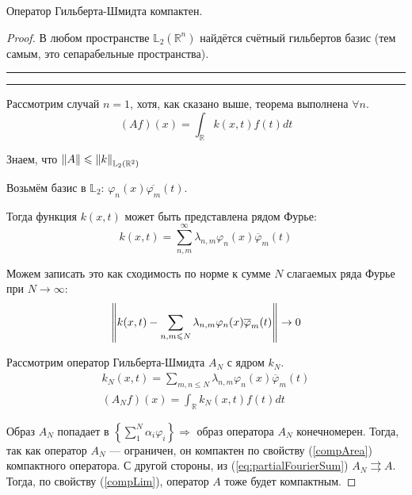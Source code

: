 \documentclass[12pt]{article}
\begin{document}
		\begin{state}
			Оператор Гильберта-Шмидта компактен.
		\end{state}
		\begin{proof}
			В любом пространстве $\mathbb{L}_2(\mathbb{R}^n)$ найдётся счётный гильбертов базис 
			(тем самым, это сепарабельные пространства).
		
			\vspace{2pt}\hrule\vspace{2pt}
		
		
		
			\vspace{2pt}\hrule\vspace{2pt}
		
			Рассмотрим случай $n=1$, хотя, как сказано выше, теорема выполнена $\forall n$. 
			$$(Af)(x) = \int_{\mathbb{R}} k(x,t) f(t) dt$$
		
			Знаем, что $\left\| A \right\| \leqslant \left\| k \right\|_{\mathbb{L}_2(\mathbb{R}^2)}$
		
			Возьмём базис в $\mathbb{L}_2$: $\varphi_n(x)\overline{\varphi_m}(t)$.
		
			Тогда функция $k(x,t)$ может быть представлена рядом Фурье:
			$$k(x,t) = \sum_{n,m}^{\infty}\lambda_{n,m}\varphi_n(x)\overline{\varphi}_m(t)$$
		
			Можем записать это как сходимость по норме к сумме $N$ слагаемых ряда Фурье при $N \rightarrow \infty$:
			\begin{equation} \label{eq:partialFourierSum}
				\left\| k(x,t) - \sum_{n,m\leqslant N}\lambda_{n,m}\varphi_n(x)\overline{\varphi}_m(t) \right\| \rightarrow 0
			\end{equation}
		
			Рассмотрим оператор Гильберта-Шмидта $A_N$ с ядром $k_N$.
			\begin{gather}
				k_N(x,t) = \sum_{m,n \leq N} \lambda_{n,m} \varphi_n(x)\overline{\varphi}_m(t) \\
				(A_Nf)(x) = \int_{\mathbb{R}} k_N(x,t) f(t) dt
			\end{gather}
		
			Образ $A_N$ попадает в $\left\{\sum_1^N \alpha_i \varphi_i \right\} \Rightarrow$ образ оператора $A_N$ 
			конечномерен. Тогда, так как оператор $A_N$ --- ограничен, он компактен по свойству (\ref{compArea}) компактного оператора.
			С другой стороны, из (\ref{eq:partialFourierSum}) $A_N \rightrightarrows A$. Тогда, по свойству (\ref{compLim}), оператор
			$A$ тоже будет компактным.
		\end{proof}
\end{document}
